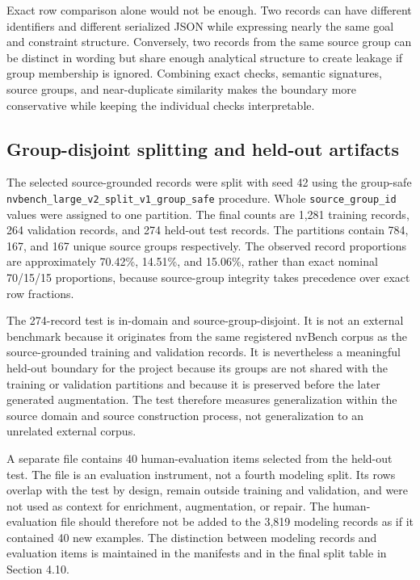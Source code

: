 Exact row comparison alone would not be enough. Two records can have different identifiers and different serialized JSON while expressing nearly the same goal and constraint structure. Conversely, two records from the same source group can be distinct in wording but share enough analytical structure to create leakage if group membership is ignored. Combining exact checks, semantic signatures, source groups, and near-duplicate similarity makes the boundary more conservative while keeping the individual checks interpretable.

\subsection{Group-disjoint splitting and held-out artifacts}

The selected source-grounded records were split with seed 42 using the group-safe \nolinkurl{nvbench_large_v2_split_v1_group_safe} procedure. Whole \texttt{source\_group\_id} values were assigned to one partition. The final counts are 1,281 training records, 264 validation records, and 274 held-out test records. The partitions contain 784, 167, and 167 unique source groups respectively. The observed record proportions are approximately 70.42\%, 14.51\%, and 15.06\%, rather than exact nominal 70/15/15 proportions, because source-group integrity takes precedence over exact row fractions.

The 274-record test is in-domain and source-group-disjoint. It is not an external benchmark because it originates from the same registered nvBench corpus as the source-grounded training and validation records. It is nevertheless a meaningful held-out boundary for the project because its groups are not shared with the training or validation partitions and because it is preserved before the later generated augmentation. The test therefore measures generalization within the source domain and source construction process, not generalization to an unrelated external corpus.

A separate file contains 40 human-evaluation items selected from the held-out test. The file is an evaluation instrument, not a fourth modeling split. Its rows overlap with the test by design, remain outside training and validation, and were not used as context for enrichment, augmentation, or repair. The human-evaluation file should therefore not be added to the 3,819 modeling records as if it contained 40 new examples. The distinction between modeling records and evaluation items is maintained in the manifests and in the final split table in Section 4.10.

